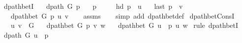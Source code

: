 \begin{isabellebody}
\endisatagproof
{\isafoldproof}%
%
\isadelimproof
\isanewline
%
\endisadelimproof
%
\isadeliminvisible
\isanewline
%
\endisadeliminvisible
%
\isataginvisible
{}\isamarkupfalse%
\ dpath{\isacharunderscore}{\kern0pt}betI{\isacharcolon}{\kern0pt}\isanewline
\ \ \ {\isachardoublequoteopen}dpath\ G\ p{\isachardoublequoteclose}\isanewline
\ \ \ {\isachardoublequoteopen}p\ {\isasymnoteq}\ {\isacharbrackleft}{\kern0pt}{\isacharbrackright}{\kern0pt}{\isachardoublequoteclose}\isanewline
\ \ \ {\isachardoublequoteopen}hd\ p\ {\isacharequal}{\kern0pt}\ u{\isachardoublequoteclose}\isanewline
\ \ \ {\isachardoublequoteopen}last\ p\ {\isacharequal}{\kern0pt}\ v{\isachardoublequoteclose}\isanewline
\ \ \ {\isachardoublequoteopen}dpath{\isacharunderscore}{\kern0pt}bet\ G\ p\ u\ v{\isachardoublequoteclose}%
\endisataginvisible
{\isafoldinvisible}%
%
\isadeliminvisible
\isanewline
%
\endisadeliminvisible
%
\isadelimproof
\ \ %
\endisadelimproof
%
\isatagproof
{}\isamarkupfalse%
\ assms\isanewline
\ \ \isamarkupfalse%
\ {\isacharparenleft}{\kern0pt}simp\ add{\isacharcolon}{\kern0pt}\ dpath{\isacharunderscore}{\kern0pt}bet{\isacharunderscore}{\kern0pt}def{\isacharparenright}{\kern0pt}%
\endisatagproof
{\isafoldproof}%
%
\isadelimproof
\isanewline
%
\endisadelimproof
%
\isadeliminvisible
\isanewline
%
\endisadeliminvisible
%
\isataginvisible
{}\isamarkupfalse%
\ dpath{\isacharunderscore}{\kern0pt}bet{\isacharunderscore}{\kern0pt}ConsI{\isacharcolon}{\kern0pt}\isanewline
\ \ \ {\isachardoublequoteopen}{\isacharparenleft}{\kern0pt}u{\isacharcomma}{\kern0pt}\ v{\isacharparenright}{\kern0pt}\ {\isasymin}\ G{\isachardoublequoteclose}\isanewline
\ \ \ {\isachardoublequoteopen}dpath{\isacharunderscore}{\kern0pt}bet\ G\ p\ v\ w{\isachardoublequoteclose}\isanewline
\ \ \ {\isachardoublequoteopen}dpath{\isacharunderscore}{\kern0pt}bet\ G\ {\isacharparenleft}{\kern0pt}u\ {\isacharhash}{\kern0pt}\ p{\isacharparenright}{\kern0pt}\ u\ w{\isachardoublequoteclose}%
\endisataginvisible
{\isafoldinvisible}%
%
\isadeliminvisible
\isanewline
%
\endisadeliminvisible
%
\isadelimproof
%
\endisadelimproof
%
\isatagproof
{}\isamarkupfalse%
\ {\isacharparenleft}{\kern0pt}rule\ dpath{\isacharunderscore}{\kern0pt}betI{\isacharparenright}{\kern0pt}\isanewline
\ \ \isamarkupfalse%
\ {\isachardoublequoteopen}dpath\ G\ {\isacharparenleft}{\kern0pt}u\ {\isacharhash}{\kern0pt}\ p{\isacharparenright}{\kern0pt}{\isachardoublequoteclose}\isanewline

\end{isabellebody}
